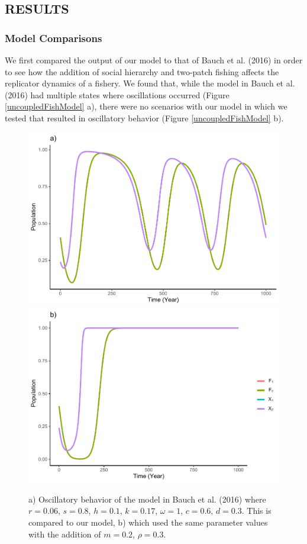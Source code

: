\documentclass[
  12pt,
]{article}
\begin{document}
\hypertarget{results-1}{%
\subsection{RESULTS}\label{results-1}}

\hypertarget{model-comparisons}{%
\subsubsection{Model Comparisons}\label{model-comparisons}}

We first compared the output of our model to that of Bauch et al. (2016) in order to see how the addition of social hierarchy and two-patch fishing affects the replicator dynamics of a fishery. We found that, while the model in Bauch et al. (2016) had multiple states where oscillations occurred (Figure \ref{uncoupledFishModel} a), there were no scenarios with our model in which we tested that resulted in oscillatory behavior (Figure \ref{uncoupledFishModel} b).



\begin{figure}
\includegraphics[width=0.5\linewidth]{Wulfing_Thesis_files/figure-latex/uncoupledFishModel-1} \includegraphics[width=0.5\linewidth]{Wulfing_Thesis_files/figure-latex/uncoupledFishModel-2} \caption{a) Oscillatory behavior of the model in Bauch et al. (2016) where \(r = 0.06\), \(s = 0.8\), \(h = 0.1\), \(k = 0.17\), \(\omega = 1\), \(c = 0.6\), \(d = 0.3\). This is compared to our model, b) which used the same parameter values with the addition of \(m = 0.2\), \(\rho = 0.3\). \label{uncoupledFishModel}}\label{fig:uncoupledFishModel}
\end{figure}
\end{document}
